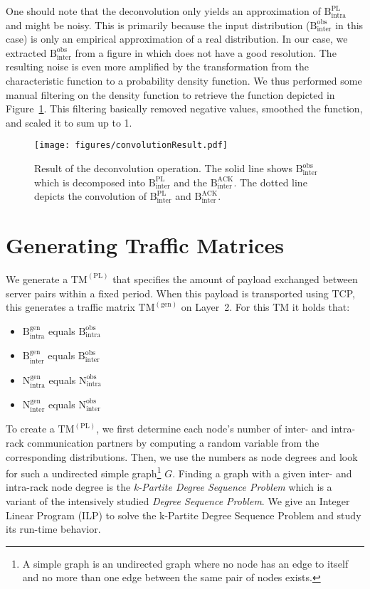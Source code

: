 \documentclass[journal,10pt]{IEEEtran}
\newcommand{\lt}{Layer~2}
\newcommand{\gentm}{\ensuremath{\mathrm{TM}^{(\mathrm{gen})}}}
\newcommand{\pltm}{\ensuremath{\mathrm{TM}^{(\mathrm{PL})}}}
\newcommand{\bytes}[2]{\ensuremath{\mathrm{B}^{\mathrm{#1}}_{\mathrm{#2}}}}
\newcommand{\partners}[2]{\ensuremath{\mathrm{N}^{\mathrm{#1}}_{\mathrm{#2}}}}
\begin{document}
	
	One should note that the deconvolution only yields an approximation of \bytes{PL}{intra} and might be noisy.
	This is primarily because the input distribution (\bytes{obs}{inter} in this case) is only an empirical approximation of a real distribution.
	In our case, we extracted \bytes{obs}{inter} from a figure in \cite{MSR-datacenters} which does not have a good resolution.
	The resulting noise is even more amplified by the transformation from the characteristic function to a 
	probability density function.
	We thus performed some manual filtering on the density function to retrieve the function depicted in Figure~\ref{fig:convolution}.
	This filtering basically removed negative values, smoothed the function, and scaled it to sum up to 1.
	

\begin{figure}
	\centering
	\texttt{[image: figures/convolutionResult.pdf]}
	\caption{Result of the deconvolution operation. The solid line shows \bytes{obs}{inter} which is decomposed into 
	\bytes{PL}{inter} and the \bytes{ACK}{inter}.
	The dotted line depicts the convolution of \bytes{PL}{inter} and \bytes{ACK}{inter}.}
	\label{fig:convolution}
\end{figure}


\section{Generating Traffic Matrices}		
\label{sec:tm}
		We generate a \pltm{} that specifies the amount of payload exchanged between server pairs within a fixed period.
		When this payload is transported using TCP, this generates a traffic matrix \gentm{} on \lt{}. For this TM it holds that:
		\begin{itemize}
			\item \bytes{gen}{intra} equals \bytes{obs}{intra}
			\item \bytes{gen}{inter} equals \bytes{obs}{inter}
			\item \partners{gen}{intra} equals \partners{obs}{intra}
			\item \partners{gen}{inter} equals \partners{obs}{inter}
		\end{itemize}
		
		To create a \pltm{}, we first determine each node's number of inter- and intra-rack communication partners by computing a random variable from 
		the corresponding distributions.	Then, we use the numbers as node degrees and look for such a 
		undirected simple graph\footnote{A simple graph is an undirected graph where no node has an edge to itself and no more than one edge between the same pair of nodes exists.} $G$.
		Finding a graph with a given inter- and intra-rack node degree 
		is the \emph{k-Partite Degree Sequence Problem} which is a variant
		of the intensively studied \emph{Degree Sequence Problem}. We give an Integer Linear Program (ILP) to solve the 
		k-Partite Degree Sequence Problem and study its run-time behavior.
		
\end{document}
